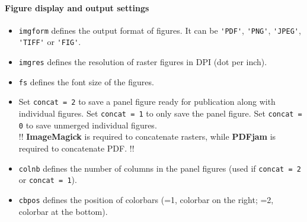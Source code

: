 \documentclass[twoside,a4paper]{article}
\def\ImageMagick{\textbf{ImageMagick}}
\def\PDFjam{\textbf{PDFjam}}
\begin{document}
\paragraph{Figure display and output settings}
\begin{itemize}[leftmargin=*]
\setlength\itemsep{2ex}
\item \verb|imgform| defines the output format of figures. It can be \verb|'PDF'|, \verb|'PNG'|, \verb|'JPEG'|, \verb|'TIFF'| or \verb|'FIG'|.

\item \verb|imgres| defines the resolution of raster figures in DPI (dot per inch).

\item \verb|fs| defines the font size of the figures.

\item Set \verb|concat = 2| to save a panel figure ready for publication along with individual figures. Set \verb|concat = 1| to only save the panel figure. Set \verb|concat = 0| to save unmerged individual figures.\\[1ex]
!! {\ImageMagick} is required to concatenate rasters, while {\PDFjam} is required to concatenate PDF. !!

\item \verb|colnb| defines the number of columns in the panel figures (used if \verb|concat = 2| or \verb|concat = 1|).

\item \verb|cbpos| defines the position of colorbars (=1, colorbar on the right; =2, colorbar at the bottom).
\end{itemize}
\end{document}
